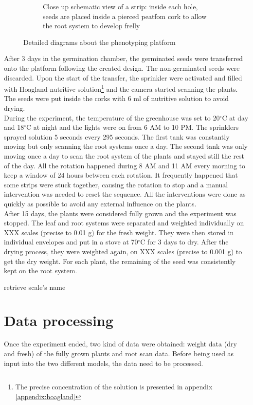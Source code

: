 \begin{figure}[!htb]
\begin{subfigure}[b]{0.475\textwidth}
            \caption{Close up schematic view of a strip: inside each hole, seeds are placed inside a pierced peatfom cork to allow the root system to develop frelly}    
            \label{fig:seed_platform_close_up}
        \end{subfigure}
        \caption{Detailed diagrams about the phenotyping platform}
    \end{figure}

After 3 days in the germination chamber, the germinated seeds were transferred onto the platform following the created design. The non-germinated seeds were discarded. Upon the start of the transfer, the sprinkler were activated and filled with Hoagland nutritive solution\footnote{The precise concentration of the solution is presented in appendix \ref{appendix:hoagland}} and the camera started scanning the plants. The seeds were put inside the corks with 6 ml of nutritive solution to avoid drying.\\
During the experiment, the temperature of the greenhouse was set to 20$^{\circ}$C at day and 18$^{\circ}$C at night and the lights were on from 6 AM to 10 PM. The sprinklers sprayed solution 5 seconds every 295 seconds. The first tank was constantly moving but only scanning the root systems once a day. The second tank was only moving once a day to scan the root system of the plants and stayed still the rest of the day. All the rotation happened during 8 AM and 11 AM every morning to keep a window of 24 hours between each rotation. It frequently happened that some strips were stuck together, causing the rotation to stop and a manual intervention was needed to reset the sequence. All the interventions were done as quickly as possible to avoid any external influence on the plants.\\
After 15 days, the plants were considered fully grown and the experiment was stopped. The leaf and root systems were separated and weighted individually on XXX scales (precise to 0.01 g) for the fresh weight. They were then stored in individual envelopes and put in a stove at 70$^{\circ}$C for 3 days to dry. After the drying process, they were weighted again, on XXX scales (precise to 0.001 g) to get the dry weight. For each plant, the remaining of the seed was consistently kept on the root system.\\
\begin{formal}
retrieve scale's name
\end{formal}

\section{Data processing}
Once the experiment ended, two kind of data were obtained: weight data (dry and fresh) of the fully grown plants and root scan data. Before being used as input into the two different models, the data need to be processed.
